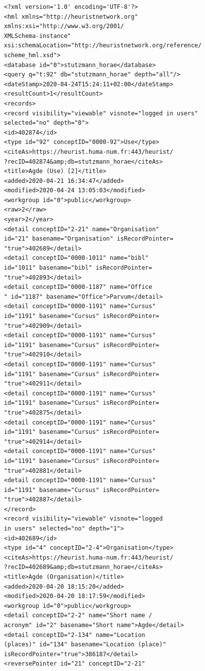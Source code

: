 \documentclass[a4paper,12pt,twoside]{book}
\begin{document}
	\begin{verbatim}
<?xml version='1.0' encoding='UTF-8'?>
<hml xmlns="http://heuristnetwork.org" xmlns:xsi="http://www.w3.org/2001/
XMLSchema-instance" xsi:schemaLocation="http://heuristnetwork.org/reference/
scheme_hml.xsd">
<database id="0">stutzmann_horae</database>
<query q="t:92" db="stutzmann_horae" depth="all"/>
<dateStamp>2020-04-24T15:24:11+02:00</dateStamp>
<resultCount>1</resultCount>
<records>
<record visibility="viewable" visnote="logged in users" 
selected="no" depth="0">
<id>402874</id>
<type id="92" conceptID="0000-92">Use</type>
<citeAs>https://heurist.huma-num.fr:443/heurist/
?recID=402874&amp;db=stutzmann_horae</citeAs>
<title>Agde (Use) [2]</title>
<added>2020-04-21 16:34:47</added>
<modified>2020-04-24 13:05:03</modified>
<workgroup id="0">public</workgroup>
<raw>2</raw>
<year>2</year>
<detail conceptID="2-21" name="Organisation" 
id="21" basename="Organisation" isRecordPointer=
"true">402689</detail>
<detail conceptID="0000-1011" name="bibl" 
id="1011" basename="bibl" isRecordPointer=
"true">402893</detail>
<detail conceptID="0000-1187" name="Office
" id="1187" basename="Office">Parvum</detail>
<detail conceptID="0000-1191" name="Cursus" 
id="1191" basename="Cursus" isRecordPointer=
"true">402909</detail>
<detail conceptID="0000-1191" name="Cursus" 
id="1191" basename="Cursus" isRecordPointer=
"true">402910</detail>
<detail conceptID="0000-1191" name="Cursus"
id="1191" basename="Cursus" isRecordPointer=
"true">402911</detail>
<detail conceptID="0000-1191" name="Cursus" 
id="1191" basename="Cursus" isRecordPointer=
"true">402875</detail>
<detail conceptID="0000-1191" name="Cursus" 
id="1191" basename="Cursus" isRecordPointer=
"true">402914</detail>
<detail conceptID="0000-1191" name="Cursus" 
id="1191" basename="Cursus" isRecordPointer=
"true">402881</detail>
<detail conceptID="0000-1191" name="Cursus" 
id="1191" basename="Cursus" isRecordPointer=
"true">402887</detail>
</record>
<record visibility="viewable" visnote="logged 
in users" selected="no" depth="1">
<id>402689</id>
<type id="4" conceptID="2-4">Organisation</type>
<citeAs>https://heurist.huma-num.fr:443/heurist/
?recID=402689&amp;db=stutzmann_horae</citeAs>
<title>Agde (Organisation)</title>
<added>2020-04-20 18:15:20</added>
<modified>2020-04-20 18:17:59</modified>
<workgroup id="0">public</workgroup>
<detail conceptID="2-2" name="Short name / 
acronym" id="2" basename="Short name">Agde</detail>
<detail conceptID="2-134" name="Location 
(places)" id="134" basename="Location (place)"
isRecordPointer="true">386187</detail>
<reversePointer id="21" conceptID="2-21" 

\end{verbatim}
\end{document}
